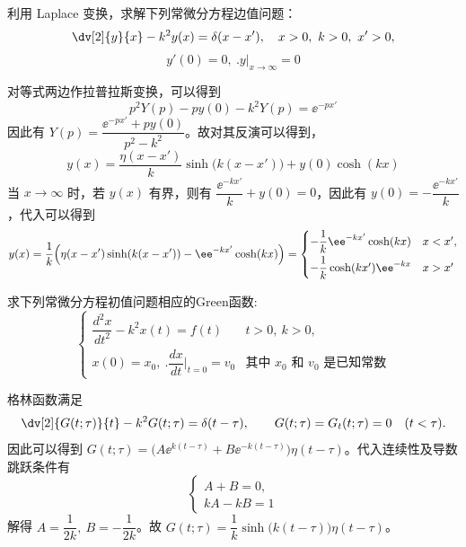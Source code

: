 \begin{question}
利用 Laplace 变换，求解下列常微分方程边值问题：
\[ \dv[2]{y}{x}-k^2 y(x)=\delta(x-x'),\quad x>0,\ k>0,\ x'>0, \] \[ y'(0)=0,\ \bigl.y\bigr|_{x\to\infty}=0 \]
\begin{solution}
对等式两边作拉普拉斯变换，可以得到 \[ p^2 Y(p) - p y(0)-k^2 Y(p)= \ee^{-p x'} \]因此有 \(Y(p)=\dfrac{\ee^{-p x'}+p y(0)}{p^2-k^2}\)。故对其反演可以得到，\[ y(x)= \frac{\eta(x-x')}{k}\sinh\bigl(k(x-x')\bigr) + y(0)\cosh(k x) \]当 \(x\to\infty\) 时，若 \(y(x)\) 有界，则有 \(\dfrac{\ee^{-k x'}}{k}+y(0)=0\)，因此有 \(y(0)=-\dfrac{\ee^{-k x'}}{k}\)，代入可以得到 \[ y(x)=\frac1k\Bigl(\eta(x-x')\sinh(k(x-x'))-\ee^{-k x'}\cosh(k x)\Bigr) = \begin{cases} -\dfrac1k \ee^{-k x'}\cosh(k x) & x<x',\\[2mm] -\dfrac1k \cosh(k x') \ee^{-k x} & x>x' \end{cases} \]
\end{solution}
\end{question}

\begin{question}
求下列常微分方程初值问题相应的Green函数:
\[ \begin{cases} \dfrac{d^2x}{dt^2} - k^2 x(t)= f(t) & t>0,\ k>0,\\ x(0)= x_0,\ \bigl.\dfrac{dx}{dt}\bigr|_{t=0}=v_0 & \text{其中 }x_0\text{ 和 }v_0\text{ 是已知常数} \end{cases} \]
\begin{solution}
格林函数满足
\[
\dv[2]{G(t;\tau)}{t}-k^2G(t;\tau)=\delta(t-\tau),
\qquad
G(t;\tau)=G_t(t;\tau)=0\quad(t<\tau).
\]
因此可以得到 \(G(t;\tau) = \bigl(A \ee^{k(t-\tau)}+B \ee^{-k(t-\tau)}\bigr)\eta(t-\tau)\)。代入连续性及导数跳跃条件有 \[ \begin{cases} A+B=0,\\ k A - k B = 1 \end{cases} \]解得 \(A=\dfrac1{2k},\ B=-\dfrac1{2k}\)。故 \(G(t;\tau) = \dfrac1k\sinh\bigl(k(t-\tau)\bigr)\eta(t-\tau)\)。
\end{solution}
\end{question}

